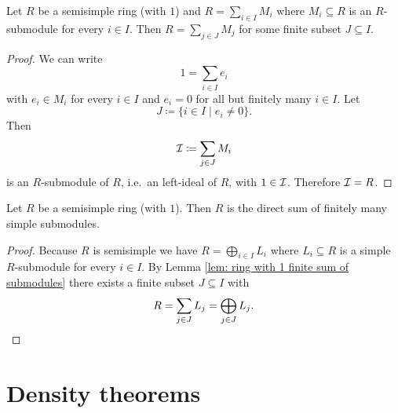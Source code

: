 \begin{lem}\label{lem: ring with 1 finite sum of submodules}
 Let $R$ be a semisimple ring (with $1$) and $R = \sum_{i \in I} M_i$ where $M_i \subseteq R$ is an $R$-submodule for every $i \in I$. Then $R = \sum_{j \in J} M_j$ for some finite subset $J \subseteq I$.
\end{lem}
\begin{proof}
 We can write
 \[
  1 = \sum_{i \in I} e_i
 \]
 with $e_i \in M_i$ for every $i \in I$ and $e_i = 0$ for all but finitely many $i \in I$. Let
 \[
  J \coloneqq \{i \in I \mid e_i \neq 0\}.
 \]
 Then
 \[
  \mathcal{I} \coloneqq \sum_{j \in J} M_i
 \]
 is an $R$-submodule of $R$, i.e.\ an left-ideal of $R$, with $1 \in \mathcal{I}$. Therefore $\mathcal{I} = R$.
\end{proof}


\begin{cor}\label{lem: semisimple ring with 1 only finitely many summands}
 Let $R$ be a semisimple ring (with $1$). Then $R$ is the direct sum of finitely many simple submodules.
\end{cor}
\begin{proof}
 Because $R$ is semisimple we have $R = \bigoplus_{i \in I} L_i$ where $L_i \subseteq R$ is a simple $R$-submodule for every $i \in I$. By Lemma \ref{lem: ring with 1 finite sum of submodules} there exists a finite subset $J \subseteq I$ with
 \[
  R = \sum_{j \in J} L_j = \bigoplus_{j \in J} L_j.
  \qedhere
 \]
\end{proof}





\section{Density theorems}


